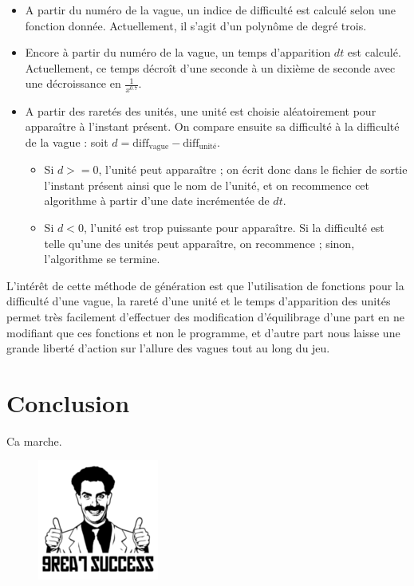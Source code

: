 \documentclass[a4paper,11pt]{article}
\begin{document}
\begin{itemize}
\item A partir du numéro de la vague, un indice de difficulté est calculé selon une fonction donnée. Actuellement, il s'agit d'un polynôme de degré trois.
\item Encore à partir du numéro de la vague, un temps d'apparition $dt$ est calculé. Actuellement, ce temps décroît d'une seconde à un dixième de seconde avec une décroissance en $\frac{1}{x^{0.7}}$.
\item A partir des raretés des unités, une unité est choisie aléatoirement pour apparaître à l'instant présent. On compare ensuite sa difficulté à la difficulté de la vague : soit $d = \text{diff}_{\text{vague}} - \text{diff}_{\text{unité}}$.
  \begin{itemize}
  \item Si $d >= 0$, l'unité peut apparaître ; on écrit donc dans le fichier de sortie l'instant présent ainsi que le nom de l'unité, et on recommence cet algorithme à partir d'une date incrémentée de $dt$.
  \item Si $d < 0$, l'unité est trop puissante pour apparaître. Si la difficulté est telle qu'une des unités peut apparaître, on recommence ; sinon, l'algorithme se termine.
  \end{itemize}
\end{itemize}

L'intérêt de cette méthode de génération est que l'utilisation de fonctions pour la difficulté d'une vague, la rareté d'une unité et le temps d'apparition des unités permet très facilement d'effectuer des modification d'équilibrage d'une part en ne modifiant que ces fonctions et non le programme, et d'autre part nous laisse une grande liberté d'action sur l'allure des vagues tout au long du jeu.

\section{Conclusion} %

Ca marche. \newline
\begin{figure}[h]
    \includegraphics{great_success.png} 
\end{figure}




\end{document}
